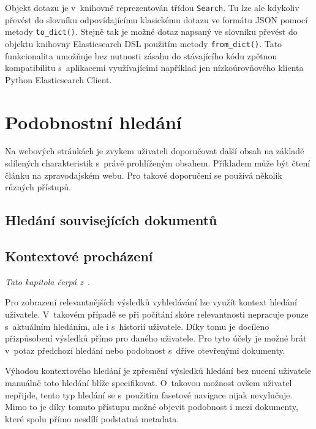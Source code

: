 Objekt dotazu je v~knihovně reprezentován třídou \texttt{Search}. Tu lze ale kdykoliv převést do slovníku odpovídajícímu klasickému dotazu ve formátu JSON pomocí metody \texttt{to\_dict()}. Stejně tak je možné dotaz napsaný ve slovníku převést do objektu knihovny Elasticsearch DSL použitím metody \texttt{from\_dict()}. Tato funkcionalita umožňuje bez nutnosti zásahu do stávajícího kódu zpětnou kompatibilitu s~aplikacemi využívajícími například jen nízkoúrovňového klienta Python Elasticsearch Client.



\section{Podobnostní hledání}
Na webových stránkách je zvykem uživateli doporučovat další obsah na základě sdílených charakteristik s~právě prohlíženým obsahem. Příkladem může být čtení článku na zpravodajském webu. Pro takové doporučení se používá několik různých přístupů.

\subsection{Hledání souvisejících dokumentů}
\blindtext[2]

\subsection{Kontextové procházení}
\emph{Tato kapitola čerpá z~\cite{bib:similarity-context}}.

Pro zobrazení relevantnějších výsledků vyhledávání lze využít kontext hledání uživatele. V~takovém případě se při počítání skóre relevantnosti nepracuje pouze s~aktuálním hledáním, ale i s~historií uživatele. Díky tomu je docíleno přizpůsobení výsledků přímo pro daného uživatele.
Pro tyto účely je možné brát v~potaz předchozí hledání nebo podobnost s~dříve otevřenými dokumenty.

Výhodou kontextového hledání je zpřesnění výsledků hledání bez nucení uživatele manuálně toto hledání blíže specifikovat. O~takovou možnost ovšem uživatel nepřijde, tento typ hledání se s~použitím fasetové navigace nijak nevylučuje. 
Mimo to je díky tomuto přístupu možné objevit podobnost i mezi dokumenty, které spolu přímo nesdílí podstatná metadata. 


